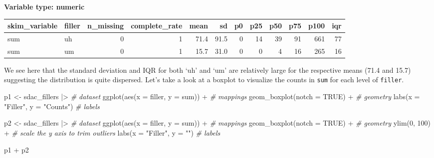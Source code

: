 \documentclass[
  letterpaper,
]{latex/krantz}
\newenvironment{Shaded}{\begin{snugshade}}{\end{snugshade}}
\newcommand{\AttributeTok}[1]{\textcolor[rgb]{0.00,0.00,0.00}{#1}}
\newcommand{\CommentTok}[1]{\textcolor[rgb]{0.00,0.00,0.00}{\textit{#1}}}
\newcommand{\ConstantTok}[1]{\textcolor[rgb]{0.00,0.00,0.00}{#1}}
\newcommand{\DecValTok}[1]{\textcolor[rgb]{0.00,0.00,0.00}{#1}}
\newcommand{\FunctionTok}[1]{\textcolor[rgb]{0.00,0.00,0.00}{#1}}
\newcommand{\NormalTok}[1]{\textcolor[rgb]{0.00,0.00,0.00}{#1}}
\newcommand{\OtherTok}[1]{\textcolor[rgb]{0.00,0.00,0.00}{#1}}
\newcommand{\SpecialCharTok}[1]{\textcolor[rgb]{0.00,0.00,0.00}{#1}}
\newcommand{\StringTok}[1]{\textcolor[rgb]{0.00,0.00,0.00}{#1}}
\begin{document}
\textbf{Variable type: numeric}

\begin{tabular}{l|l|r|r|r|r|r|r|r|r|r|r}
\hline
skim\_variable & filler & n\_missing & complete\_rate & mean & sd & p0 & p25 & p50 & p75 & p100 & iqr\\
\hline
sum & uh & 0 & 1 & 71.4 & 91.5 & 0 & 14 & 39 & 91 & 661 & 77\\
\hline
sum & um & 0 & 1 & 15.7 & 31.0 & 0 & 0 & 4 & 16 & 265 & 16\\
\hline
\end{tabular}

We see here that the standard deviation and IQR for both `uh' and `um'
are relatively large for the respective means (71.4 and 15.7) suggesting
the distribution is quite dispersed. Let's take a look at a boxplot to
visualize the counts in \texttt{sum} for each level of \texttt{filler}.

\begin{Shaded}
\begin{Highlighting}[]
\NormalTok{p1 }\OtherTok{\textless{}{-}} 
\NormalTok{  sdac\_fillers }\SpecialCharTok{|\textgreater{}} \CommentTok{\# dataset}
  \FunctionTok{ggplot}\NormalTok{(}\FunctionTok{aes}\NormalTok{(}\AttributeTok{x =}\NormalTok{ filler, }\AttributeTok{y =}\NormalTok{ sum)) }\SpecialCharTok{+} \CommentTok{\# mappings}
  \FunctionTok{geom\_boxplot}\NormalTok{(}\AttributeTok{notch =} \ConstantTok{TRUE}\NormalTok{) }\SpecialCharTok{+} \CommentTok{\# geometry}
  \FunctionTok{labs}\NormalTok{(}\AttributeTok{x =} \StringTok{"Filler"}\NormalTok{, }\AttributeTok{y =} \StringTok{"Counts"}\NormalTok{) }\CommentTok{\# labels}

\NormalTok{p2 }\OtherTok{\textless{}{-}} 
\NormalTok{  sdac\_fillers }\SpecialCharTok{|\textgreater{}} \CommentTok{\# dataset}
  \FunctionTok{ggplot}\NormalTok{(}\FunctionTok{aes}\NormalTok{(}\AttributeTok{x =}\NormalTok{ filler, }\AttributeTok{y =}\NormalTok{ sum)) }\SpecialCharTok{+} \CommentTok{\# mappings}
  \FunctionTok{geom\_boxplot}\NormalTok{(}\AttributeTok{notch =} \ConstantTok{TRUE}\NormalTok{) }\SpecialCharTok{+} \CommentTok{\# geometry}
  \FunctionTok{ylim}\NormalTok{(}\DecValTok{0}\NormalTok{, }\DecValTok{100}\NormalTok{) }\SpecialCharTok{+} \CommentTok{\# scale the y axis to trim outliers}
  \FunctionTok{labs}\NormalTok{(}\AttributeTok{x =} \StringTok{"Filler"}\NormalTok{, }\AttributeTok{y =} \StringTok{""}\NormalTok{) }\CommentTok{\# labels}

\NormalTok{p1 }\SpecialCharTok{+}\NormalTok{ p2}
\end{Highlighting}
\end{Shaded}
\end{document}
